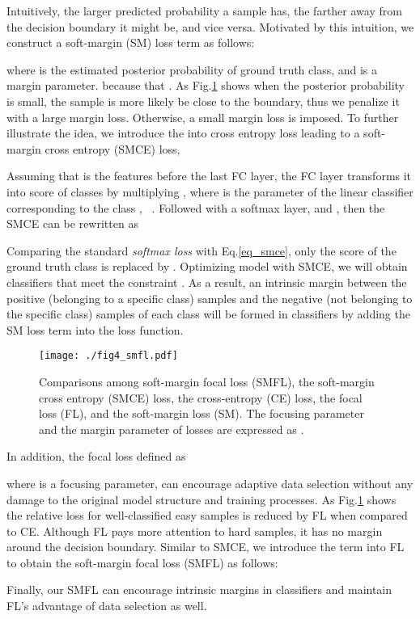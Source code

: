 \documentclass{article}
\begin{document}
Intuitively, the larger predicted probability a sample has, the farther away from the decision boundary it might be, and vice versa. Motivated by this intuition, we construct a soft-margin (SM) loss term as follows:
{\myfont
	
}where  is the estimated posterior probability of ground truth class, and  is a margin parameter. {\myfont} because that . As Fig.\ref{fig4} shows when the posterior probability  is small, the sample is more likely be close to the boundary, thus we penalize it with a large margin loss. Otherwise, a small margin loss is imposed. To further illustrate the idea, we introduce the {\myfont} into cross entropy loss leading to a soft-margin cross entropy (SMCE) loss,
{\myfont
	
}Assuming that {\myfont} is the features before the last FC layer, the FC layer transforms it into score {\myfont} of {\myfont} classes by multiplying {\myfont}, where {\myfont} is the parameter of the linear classifier corresponding to the class , \ie~{\myfont}. Followed with a softmax layer, {\myfont} and {\myfont}, then the SMCE can be rewritten as
{\myfont
	
}Comparing the standard \textit{softmax loss} with Eq.\ref{eq_smce}, only the score of the ground truth class  is replaced by . Optimizing model with SMCE, we will obtain classifiers that meet the constraint {\myfont}. As a result, an intrinsic margin  between the positive (belonging to a specific class) samples and the negative (not belonging to the specific class) samples of each class will be formed in classifiers by adding the SM loss term into the loss function.

\begin{figure}[tbp]
	\centering
	\texttt{[image: ./fig4\_smfl.pdf]}
	\caption{Comparisons among soft-margin focal loss (SMFL), the soft-margin cross entropy (SMCE) loss, the cross-entropy (CE) loss, the focal loss (FL), and the soft-margin loss (SM). The focusing parameter  and the margin parameter  of losses are expressed as .}
	\label{fig4}
\end{figure}

In addition, the focal loss \cite{DBLP:conf/iccv/LinGGHD17} defined as
{\myfont
	
}where  is a focusing parameter, can encourage adaptive data selection without any damage to the  original model structure and training processes. As Fig.\ref{fig4} shows the relative loss for well-classified easy samples is reduced by FL when compared to CE. Although FL pays more attention to hard samples, it has no margin around the decision boundary. Similar to SMCE, we introduce the {\myfont} term into FL to obtain the soft-margin focal loss (SMFL) as follows:
{\myfont
	
}Finally, our SMFL can encourage intrinsic margins in classifiers and maintain FL's advantage of data selection as well.
\end{document}
